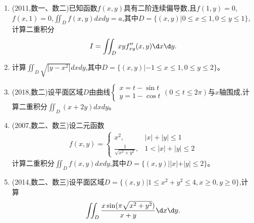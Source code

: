 \documentclass[12pt, a4paper, oneside, UTF8]{ctexbook}
\begin{document}
\begin{enumerate}[label=\arabic*.,start=6]
    \item (2011,数一、数二)已知函数$f(x,y)$具有二阶连续偏导数,且$f(1,y)=0$,$f(x,1)=0$,$\iint_D f(x,y)dxdy=a$,其中$D=\{(x,y)|0\leq x\leq 1,0\leq y\leq 1\}$,计算二重积分
    \begin{align*}
        I=\iint_D xyf_{xy}''(x,y)\d x\d y.
    \end{align*}
    
    \begin{solution}
    \newpage
    \end{solution}
    
    \item 计算$\iint_D\sqrt{|y-x^2|}dxdy$,其中$D=\{(x,y)|-1\leq x\leq 1,0\leq y\leq 2\}$。
    
    \begin{solution}
    \newpage
    \end{solution}
    
    \item (2018,数二)设平面区域$D$由曲线$\begin{cases}x=t-\sin t \\ y=1-\cos t\end{cases}(0\leq t\leq 2\pi)$与$x$轴围成,计算二重积分$\iint_D(x+2y)dxdy$。
    
    \begin{solution}
    \newpage
    \end{solution}
    
    \item (2007,数二、数三)设二元函数
    \begin{align*}
        f(x,y)=\begin{cases}
            x^2, & |x|+|y|\leq 1 \\
            \frac{1}{\sqrt{x^2+y^2}}, & 1<|x|+|y|\leq 2
        \end{cases}
    \end{align*}
    计算二重积分$\iint_D f(x,y)dxdy$,其中$D=\{(x,y)||x|+|y|\leq 2\}$。
    
    \begin{solution}
    \newpage
    \end{solution}
    
    \item (2014,数二、数三)设平面区域$D=\{(x,y)|1\leq x^2+y^2\leq 4,x\geq 0,y\geq 0\}$,计算
    \begin{align*}
        \iint_D\frac{x\sin(\pi\sqrt{x^2+y^2})}{x+y}\d x\d y.
    \end{align*}
    

\end{enumerate}
\end{document}
